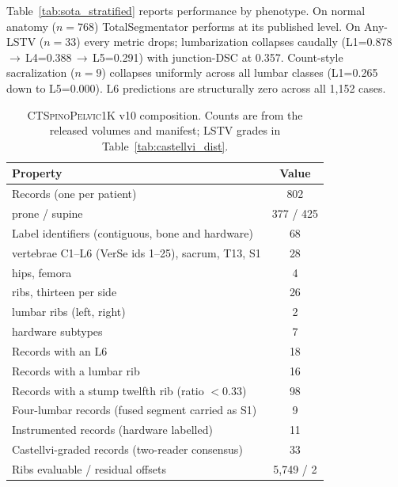 \documentclass{article}
\newcommand{\dataset}{\textsc{CTSpinoPelvic1K}}
\newcommand{\SOTA}{TotalSegmentator}
\newcommand{\VerSe}{VerSe}
\begin{document}
Table~\ref{tab:sota_stratified} reports performance by
phenotype. On normal anatomy ($n=768$) \SOTA{} performs at
its published level. On Any-LSTV ($n=33$) every metric
drops; lumbarization collapses caudally
(L1=0.878\,$\to$\,L4=0.388\,$\to$\,L5=0.291) with
junction-DSC at 0.357. Count-style sacralization ($n=9$)
collapses uniformly across all lumbar classes (L1=0.265
down to L5=0.000). \textsc{L6} predictions are
structurally zero across all 1{,}152 cases.

\begin{table}[t]
\caption{\dataset{} v10 composition. Counts are from the
released volumes and manifest; LSTV grades in
Table~\ref{tab:castellvi_dist}.}
\label{tab:scan_stats}
\centering
\small
\begin{tabular}{lc}
\toprule
\bfseries Property & \bfseries Value \\
\midrule
Records (one per patient)                         & 802 \\
\quad prone / supine                              & 377 / 425 \\
Label identifiers (contiguous, bone and hardware) & 68 \\
\quad vertebrae C1--L6 (\VerSe{} ids 1--25), sacrum, T13, S1 & 28 \\
\quad hips, femora                                & 4 \\
\quad ribs, thirteen per side                     & 26 \\
\quad lumbar ribs (left, right)                   & 2 \\
\quad hardware subtypes                           & 7 \\
Records with an L6                                & 18 \\
Records with a lumbar rib                         & 16 \\
Records with a stump twelfth rib (ratio $<0.33$)  & 98 \\
Four-lumbar records (fused segment carried as S1) & 9 \\
Instrumented records (hardware labelled)          & 11 \\
Castellvi-graded records (two-reader consensus)   & 33 \\
Ribs evaluable / residual offsets                 & 5{,}749 / 2 \\
\bottomrule
\end{tabular}
\end{table}
\end{document}
